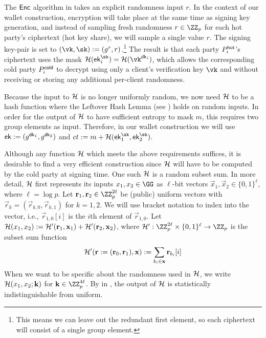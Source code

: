 The $\mathsf{Enc}$ algorithm in  takes an explicit randomness input $r$. In the context of our wallet construction, encryption will take place at the same time as signing key generation, and instead of sampling fresh randomness $r \in \ZZ_p$ for each hot party's ciphertext (hot key share), we will sample a single value $r$. The signing key-pair is set to $(\vk, \sk) := (g^r, r)$.\footnote{This means we can leave out the redundant first element, so each ciphertext will consist of a single group element.} The result is that each party $P_i^{\mathsf{hot}}$'s ciphertext uses the mask $\lhlhash(\ek_i^{\sk}) = \lhlhash(\vk^{\dk_i})$, which allows the corresponding cold party $P_i^{\mathsf{cold}}$ to decrypt using only a client's verification key $\vk$ and without receiving or storing any additional per-client randomness.

Because the input to $\mathcal{H}$ is no longer uniformly random, we now need $\mathcal{H}$ to be a hash function where the Leftover Hash Lemma (see ) holds on random inputs. In order for the output of $\mathcal{H}$ to have sufficient entropy to mask $m$, this requires two group elements as input. Therefore, in our wallet construction we will use $\mathsf{ek} := (g^{\mathsf{dk}_1}, g^{\mathsf{dk}_2})$ and $ct := m + \lhlhash(\ek_1^\sk, \ek_2^\sk)$.

Although any function $\mathcal{H}$ which meets the above requirements suffices, it is desirable to find a very efficient construction since $\mathcal{H}$ will have to be computed by the cold party at signing time. One such $\mathcal{H}$ is a random subset sum.
In more detail, $\mathcal{H}$ first represents its inputs $x_1, x_2 \in \GG$ as $\ell$-bit vectors $\vec{x}_1, \vec{x}_2 \in \{0,1\}^\ell$, where $\ell = \log{p}$. Let $\vec{r}_1, \vec{r}_2 \in \ZZ_p^{2 \ell}$ be (public) uniform vectors with $\vec{r}_k = (\vec{r}_{k,0}, \vec{r}_{k,1})$ for $k=1,2$. We will use bracket notation to index into the vector, i.e., $\vec{r}_{1,0}[i]$ is the $i$th element of $\vec{r}_{1,0}$.
Let $\mathcal{H}(x_1, x_2) := \mathcal{H}'(\mathbf{r}_1,\mathbf{x}_1) + \mathcal{H}'(\mathbf{r}_2,\mathbf{x}_2)$, where $\lhlhash':\ZZ_p^{2\ell} \times \{0,1\}^\ell \to \ZZ_p$ is the subset sum function
\[
\mathcal{H}'(\mathbf{r} := (\mathbf{r}_0, \mathbf{r}_1),\mathbf{x}) := \sum_{b_i \in \mathbf{x}} \mathbf{r}_{b_i}[i]
\]
When we want to be specific about the randomness used in $\mathcal{H}$, we write $\mathcal{H}(x_1, x_2; \mathbf{k})$ for $\vec{k} \in \ZZ_p^{4\ell}$. By  in , the output of $\mathcal{H}$ is statistically indistinguishable from uniform.